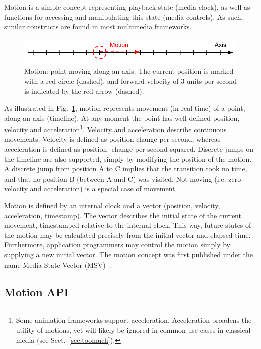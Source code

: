 Motion is a simple concept representing playback state (media clock), as well
as functions for accessing and manipulating this state (media controls). As
such, similar constructs are found in most multimedia frameworks.

\begin{figure}[h]
\centering
\includegraphics[scale=.4]{fig/motion-axis.png}
\caption{Motion: point moving along an axis. The current position
is marked with a red circle (dashed), and forward velocity of 3 units per second is
indicated by the red arrow (dashed).}
\label{fig:motion}
\end{figure}

As illustrated in Fig.~\ref{fig:motion}, motion represents movement (in real-time)
of a point, along an axis (timeline). At any moment the point has well
defined position, velocity and acceleration\footnote{Some animation frameworks
support acceleration. Acceleration broadens the utility of motions, yet will
likely be ignored in common use cases in classical media (see
Sect.~\ref{sec:toomuch}).}. Velocity and acceleration describe continuous
movements. Velocity is defined as position-change per second, whereas
acceleration is defined as position- change per second squared. Discrete jumps
on the timeline are also supported, simply by modifying the position of the
motion. A discrete jump from position A to C implies that the transition took
no time, and that no position B (between A and C) was visited. Not moving
(i.e. zero velocity and acceleration) is a special case of movement.

\label{sec:internalstate}
Motion is defined by an internal clock and a vector (position, velocity,
acceleration, timestamp). The vector describes the initial state of the
current movement, timestamped relative to the internal clock. This way, future
states of the motion may be calculated precisely from the initial vector and
elapsed time. Furthermore, application programmers may control the motion
simply by supplying a new initial vector. The motion concept was first
published under the name Media State Vector (MSV)~\cite{msv}.


\subsection{Motion API}
\label{sec:motionapi}


